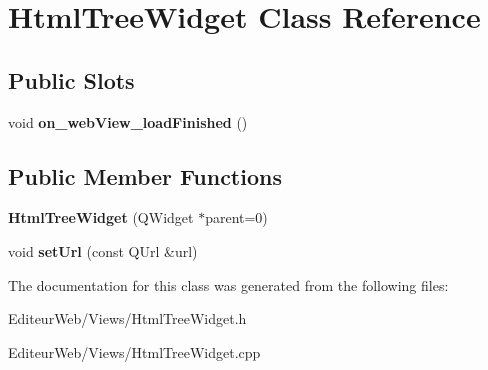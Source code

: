 \hypertarget{class_html_tree_widget}{
\section{HtmlTreeWidget Class Reference}
\label{class_html_tree_widget}
}
\subsection*{Public Slots}
\begin{DoxyCompactItemize}
\item 
\hypertarget{class_html_tree_widget_ae66f773939ace66b38f3162112f214ec}{
void {\bfseries on\_\-webView\_\-loadFinished} ()}
\label{class_html_tree_widget_ae66f773939ace66b38f3162112f214ec}

\end{DoxyCompactItemize}
\subsection*{Public Member Functions}
\begin{DoxyCompactItemize}
\item 
\hypertarget{class_html_tree_widget_a29dd7471fa54498dba14a5a08b04fd50}{
{\bfseries HtmlTreeWidget} (QWidget $\ast$parent=0)}
\label{class_html_tree_widget_a29dd7471fa54498dba14a5a08b04fd50}

\item 
\hypertarget{class_html_tree_widget_a1820bc04a1ef3f5395ed42188b9797af}{
void {\bfseries setUrl} (const QUrl \&url)}
\label{class_html_tree_widget_a1820bc04a1ef3f5395ed42188b9797af}

\end{DoxyCompactItemize}


The documentation for this class was generated from the following files:\begin{DoxyCompactItemize}
\item 
EditeurWeb/Views/HtmlTreeWidget.h\item 
EditeurWeb/Views/HtmlTreeWidget.cpp\end{DoxyCompactItemize}

